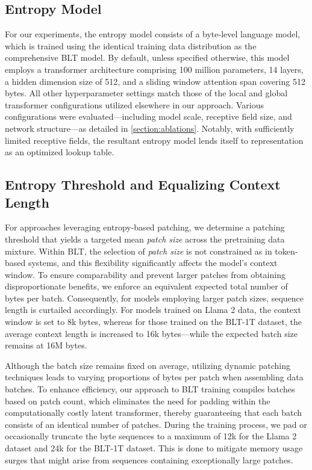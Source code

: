 \subsection{Entropy Model}  
For our experiments, the entropy model consists of a byte-level language model, which is trained using the identical training data distribution as the comprehensive {\textsc BLT} model. By default, unless specified otherwise, this model employs a transformer architecture comprising 100 million parameters, 14 layers, a hidden dimension size of 512, and a sliding window attention span covering 512 bytes. All other hyperparameter settings match those of the local and global transformer configurations utilized elsewhere in our approach. Various configurations were evaluated—including model scale, receptive field size, and network structure—as detailed in \autoref{section:ablations}. Notably, with sufficiently limited receptive fields, the resultant entropy model lends itself to representation as an optimized lookup table.

\subsection{Entropy Threshold and Equalizing Context Length} For approaches leveraging entropy-based patching, we determine a patching threshold that yields a targeted mean \textit{patch size} across the pretraining data mixture. Within {\textsc BLT}, the selection of \textit{patch size} is not constrained as in token-based systems, and this flexibility significantly affects the model's context window. To ensure comparability and prevent larger patches from obtaining disproportionate benefits, we enforce an equivalent expected total number of bytes per batch. Consequently, for models employing larger patch sizes, sequence length is curtailed accordingly. For models trained on Llama 2 data, the context window is set to 8k bytes, whereas for those trained on the {\textsc BLT}-1T dataset, the average context length is increased to 16k bytes—while the expected batch size remains at 16M bytes.

Although the batch size remains fixed on average, utilizing dynamic patching techniques leads to varying proportions of bytes per patch when assembling data batches. To enhance efficiency, our approach to {\textsc BLT} training compiles batches based on patch count, which eliminates the need for padding within the computationally costly latent transformer, thereby guaranteeing that each batch consists of an identical number of patches. During the training process, we pad or occasionally truncate the byte sequences to a maximum of 12k for the Llama 2 dataset and 24k for the {\textsc BLT}-1T dataset. This is done to mitigate memory usage surges that might arise from sequences containing exceptionally large patches.

